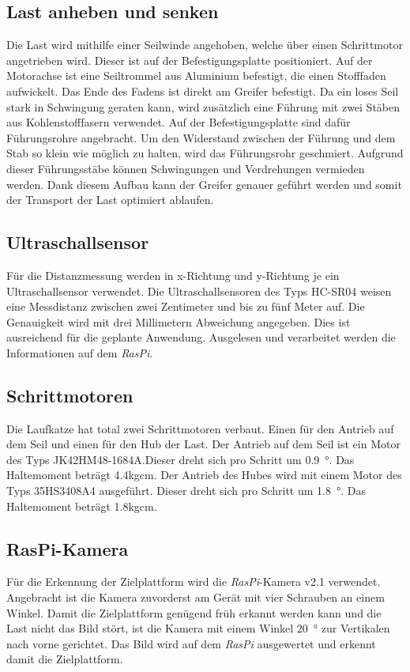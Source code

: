 \documentclass[a4paper]{report}
\begin{document}
\subsection{Last anheben und senken}
Die Last wird mithilfe einer Seilwinde angehoben, welche über einen Schrittmotor angetrieben wird. Dieser ist auf der Befestigungsplatte positioniert. Auf der Motorachse ist eine Seiltrommel aus Aluminium befestigt, die einen Stofffaden aufwickelt. Das Ende des Fadens ist direkt am Greifer befestigt. %
Da ein loses Seil stark in Schwingung geraten kann, wird zusätzlich eine Führung mit zwei Stäben aus Kohlenstofffasern verwendet. Auf der Befestigungsplatte sind dafür Führungsrohre angebracht. Um den Widerstand zwischen der Führung und dem Stab so klein wie möglich zu halten, wird das Führungsrohr geschmiert. Aufgrund dieser Führungsstäbe können Schwingungen und Verdrehungen vermieden werden.
Dank diesem Aufbau kann der Greifer genauer geführt werden und somit der Transport der Last optimiert ablaufen.

\subsection{Ultraschallsensor}
Für die Distanzmessung werden in x-Richtung und y-Richtung je ein Ultraschallsensor verwendet. Die Ultraschallsensoren des Typs HC-SR04 weisen eine Messdistanz zwischen zwei Zentimeter und bis zu fünf Meter auf. Die Genauigkeit wird mit drei Millimetern Abweichung angegeben. Dies ist ausreichend für die geplante Anwendung. Ausgelesen und verarbeitet werden die Informationen auf dem \textit{RasPi}.

\subsection{Schrittmotoren}
Die Laufkatze hat total zwei Schrittmotoren verbaut. Einen für den Antrieb auf dem Seil und einen für den Hub der Last. Der Antrieb auf dem Seil ist ein Motor des Typs JK42HM48-1684A.Dieser dreht sich pro Schritt um \SI{0.9}{\degree}. Das Haltemoment beträgt 4.4kgcm. Der Antrieb des Hubes wird mit einem Motor des Typs 35HS3408A4 ausgeführt. Dieser dreht sich pro Schritt um \SI{1.8}{\degree}. Das Haltemoment beträgt 1.8kgcm.


\subsection{RasPi-Kamera}
Für die Erkennung der Zielplattform wird die \textit{RasPi}-Kamera v2.1 verwendet. Angebracht ist die Kamera zuvorderst am Gerät mit vier Schrauben an einem Winkel. Damit die Zielplattform genügend früh erkannt werden kann und die Last nicht das Bild stört, ist die Kamera mit einem Winkel \SI{20}{\degree} zur Vertikalen nach vorne gerichtet. Das Bild wird auf dem \textit{RasPi} ausgewertet und erkennt damit die Zielplattform.
\end{document}
